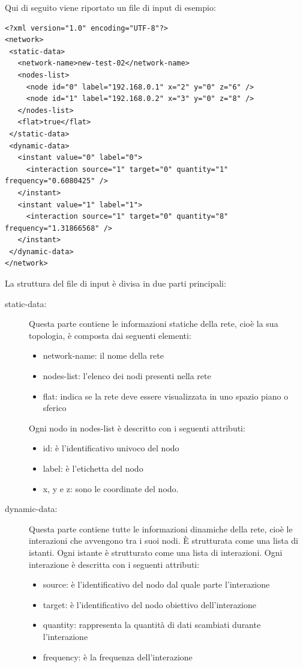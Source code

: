 \documentclass[a4paper,12pt]{article}
\begin{document}
Qui di seguito viene riportato un file di input di esempio:
\begin{verbatim}
<?xml version="1.0" encoding="UTF-8"?>
<network>
 <static-data>
   <network-name>new-test-02</network-name>
   <nodes-list>
     <node id="0" label="192.168.0.1" x="2" y="0" z="6" />
     <node id="1" label="192.168.0.2" x="3" y="0" z="8" />
   </nodes-list>
   <flat>true</flat>
 </static-data>
 <dynamic-data>
   <instant value="0" label="0">
     <interaction source="1" target="0" quantity="1" frequency="0.6080425" />
   </instant>
   <instant value="1" label="1">
     <interaction source="1" target="0" quantity="8" frequency="1.31866568" />
   </instant>
 </dynamic-data>
</network>
\end{verbatim}

La struttura del file di input \`e divisa in due parti principali:
\begin{description}
 \item[static-data:] Questa parte contiene le informazioni statiche della rete, cio\`e la sua topologia, \`e composta dai seguenti elementi:
 \begin{itemize}
  \item network-name: il nome della rete
  \item nodes-list: l'elenco dei nodi presenti nella rete
  \item flat: indica se la rete deve essere visualizzata in uno spazio piano o sferico
 \end{itemize}
Ogni nodo in nodes-list \`e descritto con i seguenti attributi:
 \begin{itemize}
  \item id: \`e l'identificativo univoco del nodo
  \item label: \`e l'etichetta del nodo
  \item x, y e z: sono le coordinate del nodo.
 \end{itemize}
 \item[dynamic-data:] Questa parte contiene tutte le informazioni dinamiche della rete, cio\`e le interazioni che avvengono tra i suoi nodi. \`E strutturata come una lista di istanti. Ogni istante \`e strutturato come una lista di interazioni. Ogni interazione \`e descritta con i seguenti attributi:
 \begin{itemize}
  \item source: \`e l'identificativo del nodo dal quale parte l'interazione
  \item target: \`e l'identificativo del nodo obiettivo dell'interazione
  \item quantity: rappresenta la quantità di dati scambiati durante l'interazione
  \item frequency: \`e la frequenza dell'interazione
 \end{itemize}
\end{description}
\end{document}
